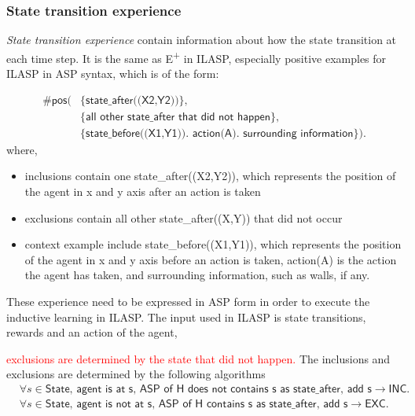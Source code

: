 \subsubsection{State transition experience}
\textit{State transition experience} contain information about how the state transition at each time step.
 It is the same as E\textsuperscript{+} in ILASP, especially positive examples for ILASP in ASP syntax, which is of the form:

\begin{equation}
\begin{split}
\textsf{\#pos(} & \textsf{\{state\_after((X2,Y2))\}},\\
& \{\textsf{all other state\_after that did not happen}\}, \\
& \{\textsf{state\_before((X1,Y1)). action(A). surrounding information}\}).
\end{split}
\end{equation}
where,
\begin{itemize}
    \item inclusions contain one state\_after((X2,Y2)), which represents the position of the agent in x and y axis after an action is taken 
    \item exclusions contain all other state\_after((X,Y)) that did not occur
    \item context example include state\_before((X1,Y1)), which represents the position of the agent in x and y axis before an action is taken,
    action(A) is the action the agent has taken, and surrounding information, such as walls, if any. 
\end{itemize}

These experience need to be expressed in ASP form in order to execute the inductive learning in ILASP. The input used in ILASP is state transitions, 
rewards and an action of the agent, 

\textcolor{red}{exclusions are determined by the state that did not happen.}
The inclusions and exclusions are determined by the following algorithms
\begin{equation*}
\begin{split}
    &\forall s \in \textsf{State, agent is at s, ASP of H does not contains s as state\_after, add s} \rightarrow \textsf{INC.} \\
    & \forall s \in \textsf{State, agent is not at s, ASP of H contains s as state\_after, add s} \rightarrow \textsf{EXC.} 
\end{split}
\end{equation*}

